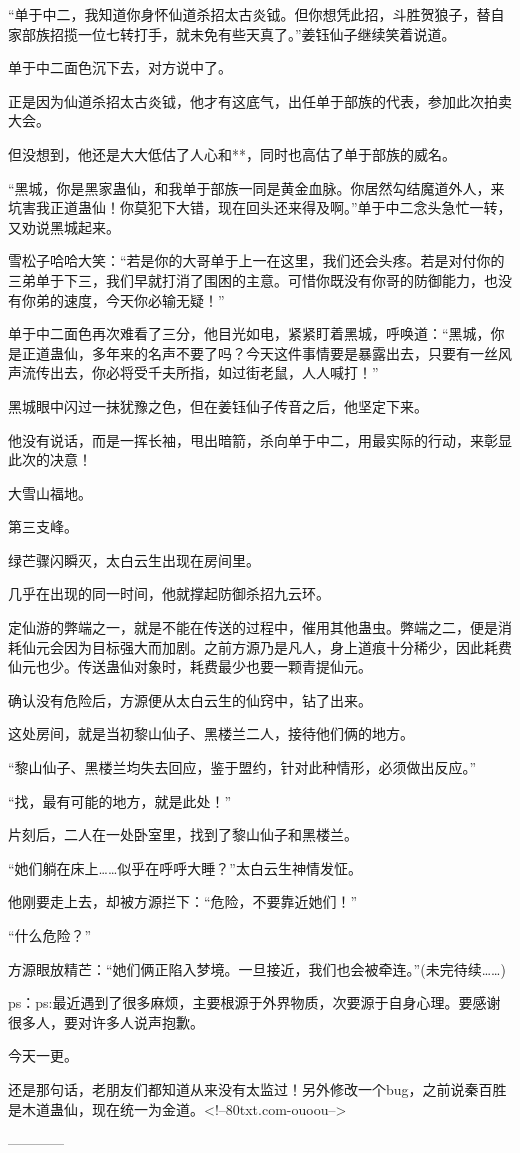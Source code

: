 \begin{this_body}
“单于中二，我知道你身怀仙道杀招太古炎钺。但你想凭此招，斗胜贺狼子，替自家部族招揽一位七转打手，就未免有些天真了。”姜钰仙子继续笑着说道。

单于中二面色沉下去，对方说中了。

正是因为仙道杀招太古炎钺，他才有这底气，出任单于部族的代表，参加此次拍卖大会。

但没想到，他还是大大低估了人心和**，同时也高估了单于部族的威名。

“黑城，你是黑家蛊仙，和我单于部族一同是黄金血脉。你居然勾结魔道外人，来坑害我正道蛊仙！你莫犯下大错，现在回头还来得及啊。”单于中二念头急忙一转，又劝说黑城起来。

雪松子哈哈大笑：“若是你的大哥单于上一在这里，我们还会头疼。若是对付你的三弟单于下三，我们早就打消了围困的主意。可惜你既没有你哥的防御能力，也没有你弟的速度，今天你必输无疑！”

单于中二面色再次难看了三分，他目光如电，紧紧盯着黑城，呼唤道：“黑城，你是正道蛊仙，多年来的名声不要了吗？今天这件事情要是暴露出去，只要有一丝风声流传出去，你必将受千夫所指，如过街老鼠，人人喊打！”

黑城眼中闪过一抹犹豫之色，但在姜钰仙子传音之后，他坚定下来。

他没有说话，而是一挥长袖，甩出暗箭，杀向单于中二，用最实际的行动，来彰显此次的决意！

大雪山福地。

第三支峰。

绿芒骤闪瞬灭，太白云生出现在房间里。

几乎在出现的同一时间，他就撑起防御杀招九云环。

定仙游的弊端之一，就是不能在传送的过程中，催用其他蛊虫。弊端之二，便是消耗仙元会因为目标强大而加剧。之前方源乃是凡人，身上道痕十分稀少，因此耗费仙元也少。传送蛊仙对象时，耗费最少也要一颗青提仙元。

确认没有危险后，方源便从太白云生的仙窍中，钻了出来。

这处房间，就是当初黎山仙子、黑楼兰二人，接待他们俩的地方。

“黎山仙子、黑楼兰均失去回应，鉴于盟约，针对此种情形，必须做出反应。”

“找，最有可能的地方，就是此处！”

片刻后，二人在一处卧室里，找到了黎山仙子和黑楼兰。

“她们躺在床上……似乎在呼呼大睡？”太白云生神情发怔。

他刚要走上去，却被方源拦下：“危险，不要靠近她们！”

“什么危险？”

方源眼放精芒：“她们俩正陷入梦境。一旦接近，我们也会被牵连。”(未完待续……)

ps：ps:最近遇到了很多麻烦，主要根源于外界物质，次要源于自身心理。要感谢很多人，要对许多人说声抱歉。

今天一更。

还是那句话，老朋友们都知道从来没有太监过！另外修改一个bug，之前说秦百胜是木道蛊仙，现在统一为金道。<!--80txt.com-ouoou-->

------------

\end{this_body}

